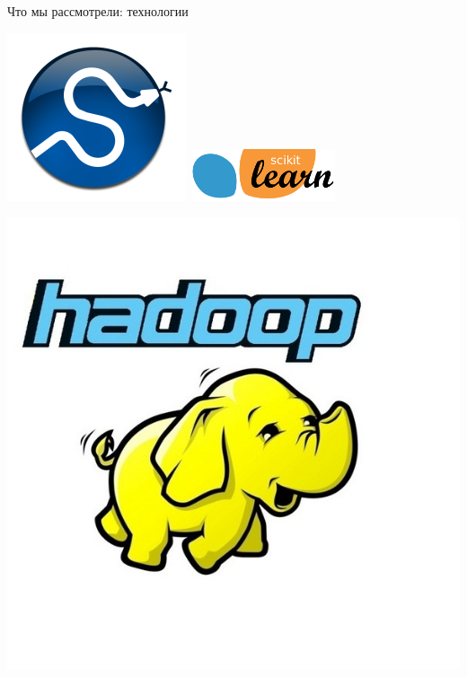 \documentclass[10pt,a4paper]{beamer}
\begin{document}
\begin{frame}{Что мы рассмотрели: технологии}

\begin{center}
\includegraphics[scale=0.3]{images/scipy.png} \quad \quad \quad
\includegraphics[scale=0.8]{images/sklearn.png}

\includegraphics[scale=0.3]{images/hadoop.jpg}
\end{center}

\end{frame}

\end{document}
